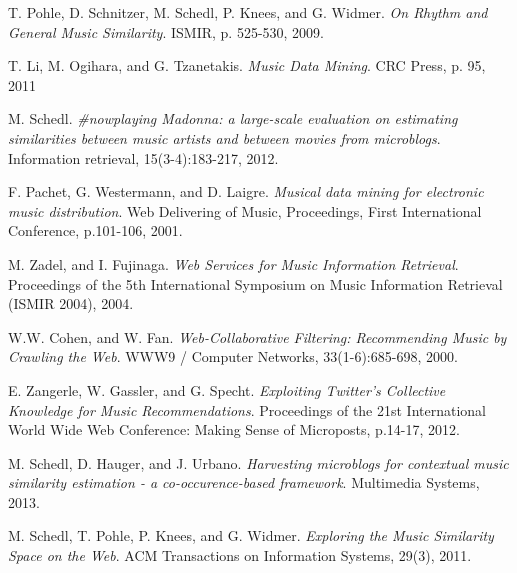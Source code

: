 \documentclass[11pt, oneside, openright]{Thesis} %
\begin{document}
\begin{thebibliography}{99}
T. Pohle, D. Schnitzer, M. Schedl, P. Knees, and G. Widmer.
\textit{On Rhythm and General Music Similarity}.
ISMIR, p. 525-530, 2009.

T. Li, M. Ogihara, and G. Tzanetakis.
\textit{Music Data Mining}.
CRC Press, p. 95, 2011

M. Schedl.
\textit{#nowplaying Madonna: a large-scale evaluation on estimating similarities between music artists and between movies from microblogs}.
Information retrieval, 15(3-4):183-217, 2012.

F. Pachet, G. Westermann, and D. Laigre.
\textit{Musical data mining for electronic music distribution}.
Web Delivering of Music, Proceedings, First International Conference, p.101-106, 2001.

M. Zadel, and I. Fujinaga.
\textit{Web Services for Music Information Retrieval}.
Proceedings of the 5th International Symposium on Music Information Retrieval (ISMIR 2004), 2004.

W.W. Cohen, and W. Fan.
\textit{Web-Collaborative Filtering: Recommending Music by Crawling the Web}.
WWW9 / Computer Networks, 33(1-6):685-698, 2000.

E. Zangerle, W. Gassler, and G. Specht.
\textit{Exploiting Twitter's Collective Knowledge for Music Recommendations}.
Proceedings of the 21st International World Wide Web Conference: Making Sense of Microposts, p.14-17, 2012.

M. Schedl, D. Hauger, and J. Urbano.
\textit{Harvesting microblogs for contextual music similarity estimation - a co-occurence-based framework}.
Multimedia Systems, 2013.

M. Schedl, T. Pohle, P. Knees, and G. Widmer.
\textit{Exploring the Music Similarity Space on the Web}.
ACM Transactions on Information Systems, 29(3), 2011.


\end{thebibliography}


\end{document}
